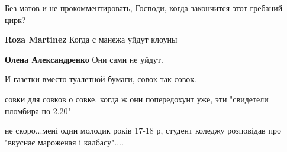 \begin{itemize}
Без матов и не прокомментировать, Господи, когда закончится этот гребаний цирк?

\begin{itemize}
 
\textbf{Roza Martinez} Когда с манежа уйдут клоуны

 
\textbf{Олена Александренко} Они сами не уйдут.
\end{itemize}

 
И газетки вместо туалетной бумаги, совок так совок.

 
совки для совков о совке. когда ж они попередохунт уже, эти "свидетели пломбира по 2.20"

\begin{itemize}
 
не скоро...мені один молодик років 17-18 р, студент коледжу розповідав про "вкуснає мароженая і калбасу"....

 

\end{itemize}
\end{itemize}
